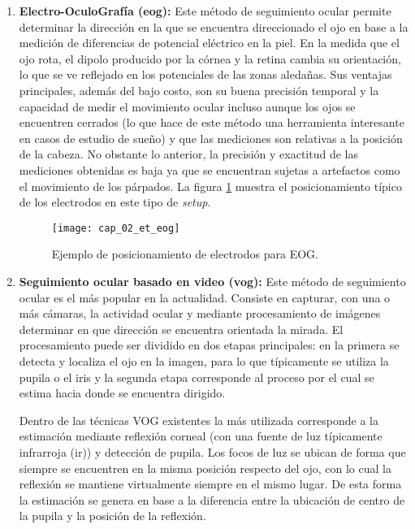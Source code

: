 \documentclass[../main.tex]{subfiles}
\begin{document}
\begin{enumerate}
				\item \textbf{Electro-OculoGrafía (\acrshort{eog}):} Este método de seguimiento ocular permite determinar la dirección en la que se encuentra direccionado el ojo en base a la medición de diferencias de potencial eléctrico en la piel. En la medida que el ojo rota, el dipolo producido por la córnea y la retina cambia su orientación, lo que se ve reflejado en los potenciales de las zonas aledañas. Sus ventajas principales, además del bajo costo, son su buena precisión temporal y la capacidad de medir el movimiento ocular incluso aunque los ojos se encuentren cerrados (lo que hace de este método una herramienta interesante en casos de estudio de sueño) y que las mediciones son relativas a la posición de la cabeza. No obstante lo anterior, la precisión y exactitud de las mediciones obtenidas es baja ya que se encuentran sujetas a artefactos como el movimiento de los párpados. La figura \ref{fig:02_et_eog} muestra el posicionamiento típico de los electrodos en este tipo de \textit{\gls{setup}}. 
				\begin{figure}[H]
					\centering
					\texttt{[image: cap\_02\_et\_eog]}
					\caption[Ejemplo de posicionamiento de electrodos para EOG]{Ejemplo de posicionamiento de electrodos para EOG\footnotemark.}
					\label{fig:02_et_eog}
				\end{figure}

				\item \textbf{Seguimiento ocular basado en video (\acrshort{vog}):} Este método de seguimiento ocular es el más popular en la actualidad. Consiste en capturar, con una o más cámaras, la actividad ocular y mediante procesamiento de imágenes determinar en que dirección se encuentra orientada la mirada. El procesamiento puede ser dividido en dos etapas principales: en la primera se detecta y localiza el ojo en la imagen, para lo que típicamente se utiliza la pupila o el iris y la segunda etapa corresponde al proceso por el cual se estima hacia donde se encuentra dirigido. 

				Dentro de las técnicas VOG existentes la más utilizada corresponde a la estimación mediante reflexión corneal (con una fuente de luz típicamente infrarroja (\acrshort{ir})) y detección de pupila. Los focos de luz se ubican de forma que siempre se encuentren en la misma posición respecto del ojo, con lo cual la reflexión se mantiene virtualmente siempre en el mismo lugar. De esta forma la estimación se genera en base a la diferencia entre la ubicación de centro de la pupila y la posición de la reflexión.  


\end{enumerate}
\end{document}
